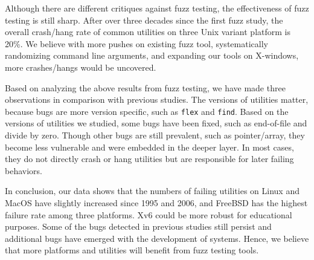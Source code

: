 
Although there are different critiques against fuzz testing, the effectiveness of fuzz testing is still sharp. After over three decades since the first fuzz study, the overall crash/hang rate of common utilities on three Unix variant platform is 20\%. We believe with more pushes on existing fuzz tool, systematically randomizing command line arguments, and expanding our tools on X-windows, more crashes/hangs would be uncovered. 

Based on analyzing the above results from fuzz testing, we have made three observations in comparison with previous studies. The versions of utilities matter, because bugs are more version specific, such as \texttt{flex} and \texttt{find}. Based on the versions of utilities we studied, some bugs have been fixed, such as end-of-file and divide by zero. Though other bugs are still prevalent, such as pointer/array, they become less vulnerable and were embedded in the deeper layer. In most cases, they do not directly crash or hang utilities but are responsible for later failing behaviors. 

In conclusion, our data shows that the numbers of failing utilities on Linux and MacOS have slightly increased since 1995 and 2006, and FreeBSD has the highest failure rate among three platforms. Xv6 could be more robust for educational purposes. Some of the bugs detected in previous studies still persist and additional bugs have emerged with the development of systems. Hence, we believe that more platforms and utilities will benefit from fuzz testing tools.